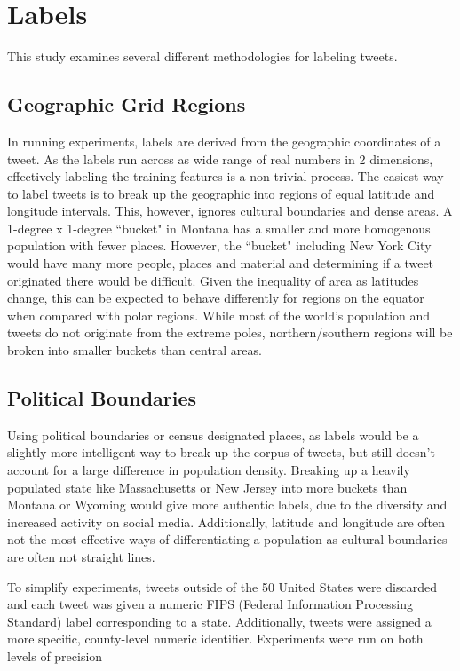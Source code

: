 \documentclass[midd]{thesis}
\begin{document}
\section{Labels}
This study examines several different methodologies for labeling tweets.

\subsection{Geographic Grid Regions}
In running experiments, labels are derived from the geographic coordinates of a tweet. As the labels run across as wide range of real numbers in 2 dimensions, effectively labeling the training features is a non-trivial process. The easiest way to label tweets is to break up the geographic into regions of equal latitude and longitude intervals. This, however, ignores cultural boundaries and dense areas. A 1-degree x 1-degree ``bucket" in Montana has a smaller and more homogenous population with fewer places. However, the ``bucket" including New York City would have many more people, places and material and determining if a tweet originated there would be difficult. Given the inequality of area as latitudes change, this can be expected to behave differently for regions on the equator when compared with polar regions. While most of the world's population and tweets do not originate from the extreme poles, northern/southern regions will be broken into smaller buckets than central areas.

\subsection{Political Boundaries}
Using political boundaries or census designated places, as labels would be a slightly more intelligent way to break up the corpus of tweets, but still doesn't account for a large difference in population density. Breaking up a heavily populated state like Massachusetts or New Jersey into more buckets than Montana or Wyoming would give more authentic labels, due to the diversity and increased activity on social media. Additionally, latitude and longitude are often not the most effective ways of differentiating a population as cultural boundaries are often not straight lines.

To simplify experiments, tweets outside of the 50 United States were discarded and each tweet was given a numeric FIPS (Federal Information Processing Standard) label corresponding to a state. Additionally, tweets were assigned a more specific, county-level numeric identifier. Experiments were run on both levels of precision
\end{document}
